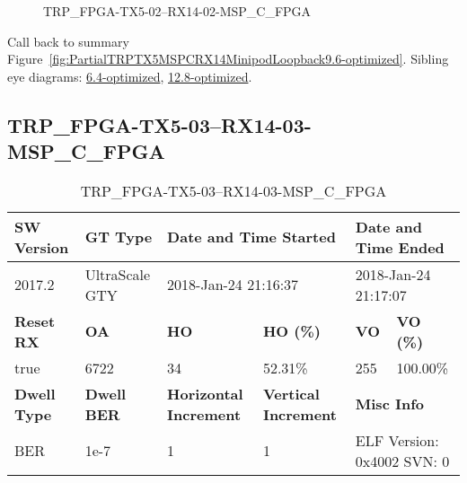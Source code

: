 \begin{figure}[h]
\caption{TRP\_FPGA-TX5-02--RX14-02-MSP\_C\_FPGA} \label{fig:TRPFPGATX502RX1402MSPCFPGA9.6-optimized}
\end{figure}

Call back to summary Figure~\ref{fig:PartialTRPTX5MSPCRX14MinipodLoopback9.6-optimized}.
Sibling eye diagrams: \hyperref[sec:TRPFPGATX502RX1402MSPCFPGA6.4-optimized]{6.4-optimized}, \hyperref[sec:TRPFPGATX502RX1402MSPCFPGA12.8-optimized]{12.8-optimized}.

\clearpage
\newpage


\subsection{TRP\_FPGA-TX5-03--RX14-03-MSP\_C\_FPGA}\label{sec:TRPFPGATX503RX1403MSPCFPGA9.6-optimized}

\begin{table}[h]
\centering
\caption{TRP\_FPGA-TX5-03--RX14-03-MSP\_C\_FPGA}
\label{tab:TRPFPGATX503RX1403MSPCFPGA9.6-optimized}
\begin{tabular}{@{}|l|l|l|l|l|l|@{}}
\toprule
\textbf{SW Version}                & \textbf{GT Type}   & \multicolumn{2}{l|}{\textbf{Date and Time Started}}            & \multicolumn{2}{l|}{\textbf{Date and Time Ended}}        \\ \midrule
2017.2                       & UltraScale GTY          & \multicolumn{2}{l|}{2018-Jan-24 21:16:37}                   & \multicolumn{2}{l|}{2018-Jan-24 21:17:07}               \\ \midrule
\textbf{Reset RX}                  & \textbf{OA} & \textbf{HO}   & \textbf{HO (\%)} & \textbf{VO} & \textbf{VO (\%)} \\ \midrule
true & 6722        & 34          & 52.31\%        & 255        & 100.00\%       \\ \midrule
\textbf{Dwell Type}                & \textbf{Dwell BER} & \textbf{Horizontal Increment} & \textbf{Vertical Increment}    & \multicolumn{2}{l|}{\textbf{Misc Info}}                  \\ \midrule
BER                            & 1e-7        & 1        & 1           & \multicolumn{2}{l|}{ELF Version: 0x4002 SVN: 0}                         \\ \bottomrule
\end{tabular}
\end{table}


